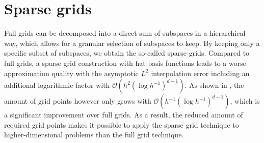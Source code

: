 \documentclass[
  a4paper,  %
  twoside,  %
  bibliography=totoc,
  headsepline,
  cleardoublepage=empty,
  parskip=half,
  draft=false
]{scrbook}
\begin{document}
\section{Sparse grids}

Full grids can be decomposed into a direct sum of subspaces in a hierarchical way, which allows for a granular selection of subspaces to keep.
By keeping only a specific subset of subspaces, we obtain the so-called sparse grids.
Compared to full grids, a sparse grid construction with hat basis functions leads to a worse approximation quality with the asymptotic $L^2$ interpolation error including an additional logarithmic factor with $\mathcal{O}(h^2 (\log h^{-1})^{d-1})$.
As shown in \cite{Bungartz2004}, the amount of grid points however only grows with $\mathcal{O}(h^{-1} (\log h^{-1})^{d-1})$, which is a significant improvement over full grids.
As a result, the reduced amount of required grid points makes it possible to apply the sparse grid technique to higher-dimensional problems than the full grid technique.
\end{document}
